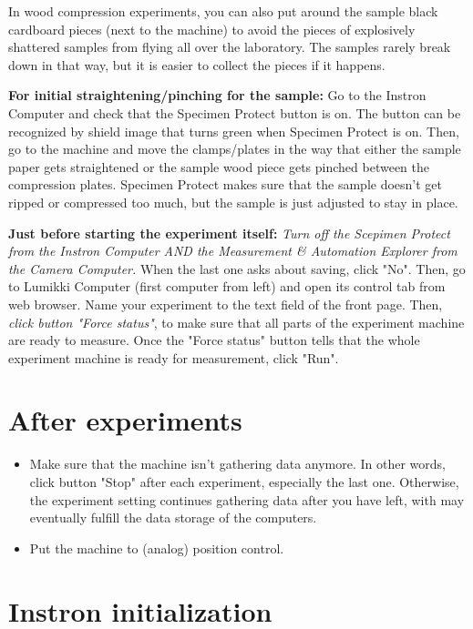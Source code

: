 \documentclass[a4paper]{article}
\begin{document}
In wood compression experiments, you can also put around the sample black cardboard 
pieces (next to the machine) to avoid the pieces of explosively shattered samples 
from flying all over the laboratory. The samples rarely break down in that way, 
but it is easier to collect the pieces if it happens.

\textbf{For initial straightening/pinching for the sample:} Go to the Instron 
Computer and check that the Specimen Protect button is on. The button can be 
recognized by shield image that turns green when Specimen Protect is on. Then, 
go to the machine and move the clamps/plates in the way that either the sample 
paper gets straightened or the sample wood piece gets pinched between the 
compression plates. Specimen Protect makes sure that the sample doesn't get 
ripped or compressed too much, but the sample is just adjusted to stay in place.

\textbf{Just before starting the experiment itself:} \emph{Turn off the Scepimen 
Protect from the Instron Computer AND the Measurement \& Automation Explorer from 
the Camera Computer.} When the last one asks about saving, click "No". Then, go to 
Lumikki Computer (first computer from left) and open its control tab from web browser. 
Name your experiment to the text field of the front page. Then, \emph{click button 
"Force status"}, to make sure that all parts of the experiment machine are ready to 
measure. Once the "Force status" button tells that the whole experiment machine is 
ready for measurement, click "Run".

\section{After experiments}

\begin{itemize}
  \item Make sure that the machine isn't gathering data anymore. In other words, click button "Stop" after each experiment, especially the last one. Otherwise, the experiment setting continues gathering data after you have left, with may eventually fulfill the data storage of the computers.
  \item Put the machine to (analog) position control.
\end{itemize}


\section{Instron initialization}
\end{document}

